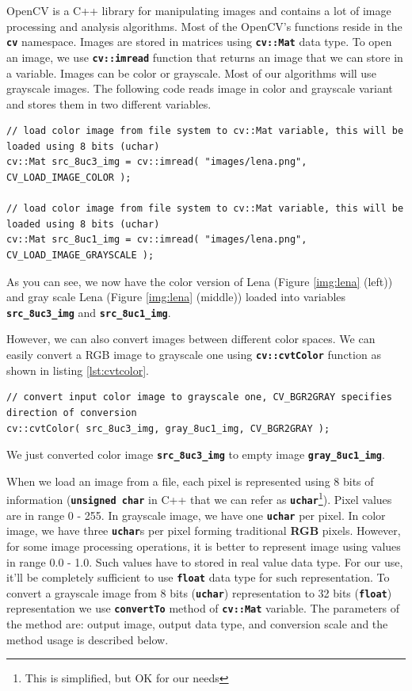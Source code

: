 \documentclass[10pt]{article}
\newcommand{\code}[1]{\textbf{\texttt{#1}}}
\begin{document}
OpenCV is a C++ library for manipulating images and contains a lot of image processing and analysis algorithms.
Most of the OpenCV's functions reside in the \code{cv} namespace.
Images are stored in matrices using \code{cv::Mat} data type.
To open an image, we use \code{cv::imread} function that returns an image that we can store in a variable.
Images can be color or grayscale. Most of our algorithms will use grayscale images.
The following code reads image in color and grayscale variant and stores them in two different variables.

\begin{lstlisting}[style=CStyle,caption={Reading image.},label={lst:read_image}]
// load color image from file system to cv::Mat variable, this will be loaded using 8 bits (uchar)
cv::Mat src_8uc3_img = cv::imread( "images/lena.png", CV_LOAD_IMAGE_COLOR );

// load color image from file system to cv::Mat variable, this will be loaded using 8 bits (uchar)
cv::Mat src_8uc1_img = cv::imread( "images/lena.png", CV_LOAD_IMAGE_GRAYSCALE );
\end{lstlisting}

As you can see, we now have the color version of Lena (Figure \ref{img:lena} (left)) and gray scale Lena (Figure \ref{img:lena} (middle))
loaded into variables \code{src\_8uc3\_img} and \code{src\_8uc1\_img}.

However, we can also convert images between different color spaces.
We can easily convert a RGB image to grayscale one using \code{cv::cvtColor}
function as shown in listing \ref{lst:cvtcolor}.

\begin{lstlisting}[style=CStyle,caption={Reading image.},label={lst:cvtcolor}]
// convert input color image to grayscale one, CV_BGR2GRAY specifies direction of conversion
cv::cvtColor( src_8uc3_img, gray_8uc1_img, CV_BGR2GRAY );
\end{lstlisting}

We just converted color image \code{src\_8uc3\_img} to empty image \code{gray\_8uc1\_img}.

When we load an image from a file, each pixel is represented using 8 bits of information (\code{unsigned char} in C++ that we can refer as
\code{uchar}\footnote{This is simplified, but OK for our needs}). Pixel values are in range 0 - 255. In grayscale image, we have one \code{uchar} per pixel.
In color image, we have three \code{uchar}s per pixel forming traditional \textbf{RGB} pixels.
However, for some image processing operations, it is better to represent image using values in range 0.0 - 1.0.
Such values have to stored in real value data type. For our use, it'll be completely sufficient to use \code{float} data type for such representation.
To convert a grayscale image from 8 bits (\code{uchar}) representation to 32 bits (\code{float}) representation we use \code{convertTo} method of \code{cv::Mat} variable.
The parameters of the method are: output image, output data type, and conversion scale and the method usage is described below.
\end{document}
